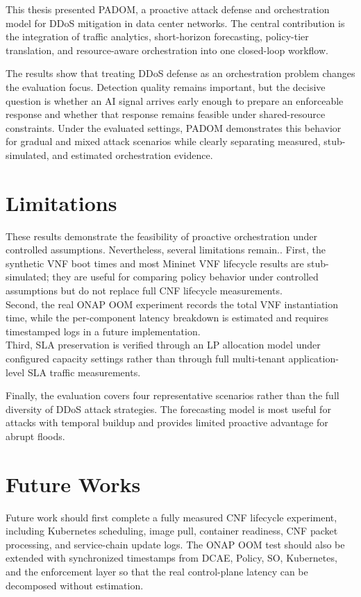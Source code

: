 \documentclass[12pt, a4paper, reqno, oneside]{book}
\newcommand{\padonap}{\textsc{PADOM}}
\begin{document}
This thesis presented \padonap{}, a proactive attack defense and orchestration model for DDoS mitigation in data center networks. The central contribution is the integration of traffic analytics, short-horizon forecasting, policy-tier translation, and resource-aware orchestration into one closed-loop workflow.

The results show that treating DDoS defense as an orchestration problem changes
the evaluation focus. Detection quality remains important, but the decisive question is whether an AI signal arrives early enough to prepare an enforceable response and whether that response remains feasible under shared-resource constraints. Under the evaluated settings, \padonap{} demonstrates this behavior for gradual and mixed attack scenarios while clearly separating measured, stub-simulated, and estimated orchestration evidence.

\section*{Limitations}

These results demonstrate the feasibility of proactive orchestration under controlled assumptions. Nevertheless, several limitations remain.. First, the synthetic VNF boot times and most
Mininet VNF lifecycle results are stub-simulated; they are useful for comparing policy behavior under controlled assumptions but do not replace full CNF lifecycle measurements. \\
Second, the real ONAP OOM experiment records the total
VNF instantiation time, while the per-component latency breakdown is estimated and requires timestamped logs in a future implementation. \\
Third, SLA preservation is verified through an LP allocation model under configured capacity settings rather than through full multi-tenant application-level SLA traffic measurements.

Finally, the evaluation covers four representative scenarios rather than the full diversity of DDoS attack strategies. The forecasting model is most useful for attacks with temporal buildup and provides limited proactive advantage for abrupt floods.

\section*{Future Works}

Future work should first complete a fully measured CNF lifecycle experiment, including Kubernetes scheduling, image pull, container readiness, CNF packet processing, and service-chain update logs. The ONAP OOM test should also be extended with synchronized timestamps from DCAE, Policy, SO,
Kubernetes, and the enforcement layer so that the real control-plane latency can be decomposed without estimation.
\end{document}
